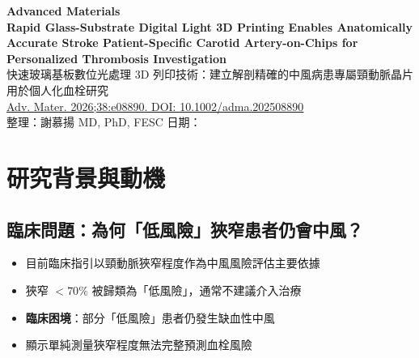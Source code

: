 \documentclass[12pt,a4paper]{article}
\begin{document}
\begin{center}
{\LARGE\bfseries\textcolor{emergency_red}{Advanced Materials}}\\[0.5cm]
{\Large\textbf{Rapid Glass-Substrate Digital Light 3D Printing Enables Anatomically Accurate Stroke Patient-Specific Carotid Artery-on-Chips for Personalized Thrombosis Investigation}}\\[0.3cm]
{\large 快速玻璃基板數位光處理 3D 列印技術：建立解剖精確的中風病患專屬頸動脈晶片用於個人化血栓研究}\\[0.5cm]
{\normalsize \href{https://doi.org/10.1002/adma.202508890}{Adv. Mater. 2026;38:e08890. DOI: 10.1002/adma.202508890}}\\[0.3cm]
{\normalsize 整理：謝慕揚 MD, PhD, FESC \quad 日期：\mydate}
\end{center}

\tableofcontents
\newpage

\section{研究背景與動機}

\subsection{臨床問題：為何「低風險」狹窄患者仍會中風？}

\begin{itemize}
    \item 目前臨床指引以頸動脈狹窄程度作為中風風險評估主要依據
    \item 狹窄 $<70\%$ 被歸類為「低風險」，通常不建議介入治療
    \item \textbf{臨床困境}：部分「低風險」患者仍發生缺血性中風
    \item 顯示單純測量狹窄程度無法完整預測血栓風險
\end{itemize}

\end{document}
